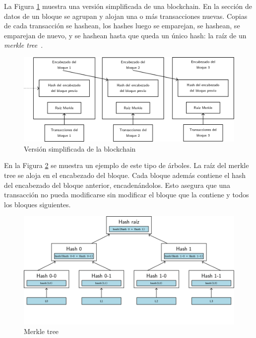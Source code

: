 La Figura \ref{fig:blockchain} muestra una versión simplificada de una blockchain. En la sección de datos de un bloque
se agrupan y alojan una o más transacciones nuevas. Copias de cada transacción se hashean, los hashes luego
se emparejan, se hashean, se emparejan de nuevo, y se hashean hasta que queda un único hash: la raíz de un
\textit{merkle tree}~\cite{merkle.tree}. 

\begin{figure}[h]
  \centering
  \includegraphics[scale=0.4]{figures/blockchain.png}
  \caption{Versión simplificada de la blockchain}
  \label{fig:blockchain}
\end{figure}


En la Figura \ref{fig:merkle-tree} se muestra un ejemplo de este tipo de árboles.
La raíz del merkle tree se aloja en el encabezado del bloque. Cada bloque además contiene el hash del encabezado
del bloque anterior, encadenándolos. Esto asegura que una transacción no pueda modificarse sin modificar el bloque
que la contiene y todos los bloques siguientes.~\cite{bitcoin}

\begin{figure}[h]
  \centering
  \includegraphics[scale=0.4]{figures/merkle-tree.png}
  \caption{Merkle tree}
  \label{fig:merkle-tree}
\end{figure}


